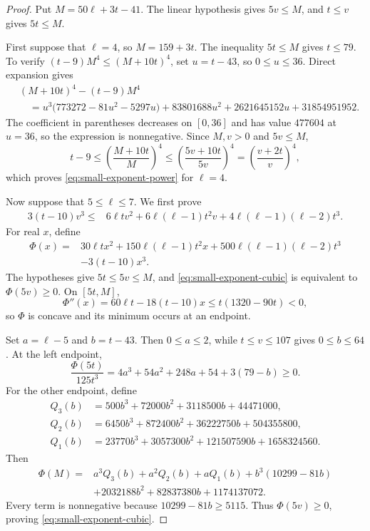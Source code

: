 \begin{proof}
Put \(M=50\ell+3t-41\).  The linear hypothesis gives \(5v\le M\), and
\(t\le v\) gives \(5t\le M\).

First suppose that \(\ell=4\), so \(M=159+3t\).  The inequality
\(5t\le M\) gives \(t\le79\).  To verify
\((t-9)M^4\le(M+10t)^4\), set \(u=t-43\), so \(0\le u\le36\).  Direct
expansion gives
\begin{align*}
 &(M+10t)^4-(t-9)M^4\\
 &\quad={}
 u^3\bigl(773272-81u^2-5297u\bigr)
 +83801688u^2+2621645152u+31854951952.
\end{align*}
The coefficient in parentheses decreases on \([0,36]\) and has value
\(477604\) at \(u=36\), so the expression is nonnegative.  Since
\(M,v>0\) and \(5v\le M\),
\[
 t-9\le\left(\frac{M+10t}{M}\right)^4
 \le\left(\frac{5v+10t}{5v}\right)^4
 =\left(\frac{v+2t}{v}\right)^4,
\]
which proves \eqref{eq:small-exponent-power} for \(\ell=4\).

Now suppose that \(5\le\ell\le7\).  We first prove
\begin{align}
 3(t-10)v^3\le{}&6\ell t v^2
 +6\ell(\ell-1)t^2v
 +4\ell(\ell-1)(\ell-2)t^3. \label{eq:small-exponent-cubic}
\end{align}
For real \(x\), define
\begin{align*}
 \Phi(x)={}&30\ell t x^2+150\ell(\ell-1)t^2x
       +500\ell(\ell-1)(\ell-2)t^3\\
       &-3(t-10)x^3.
\end{align*}
The hypotheses give \(5t\le5v\le M\), and
\eqref{eq:small-exponent-cubic} is equivalent to \(\Phi(5v)\ge0\).  On
\([5t,M]\),
\[
 \Phi''(x)=60\ell t-18(t-10)x
 \le t(1320-90t)<0,
\]
so \(\Phi\) is concave and its minimum occurs at an endpoint.

Set \(a=\ell-5\) and \(b=t-43\).  Then \(0\le a\le2\), while
\(t\le v\le107\) gives \(0\le b\le64\).  At the left endpoint,
\[
 \frac{\Phi(5t)}{125t^3}
 =4a^3+54a^2+248a+54+3(79-b)\ge0.
\]
For the other endpoint, define
\begin{align*}
 Q_3(b)&=500b^3+72000b^2+3118500b+44471000,\\
 Q_2(b)&=6450b^3+872400b^2+36222750b+504355800,\\
 Q_1(b)&=23770b^3+3057300b^2+121507590b+1658324560.
\end{align*}
Then
\begin{align*}
 \Phi(M)={}&a^3Q_3(b)+a^2Q_2(b)+aQ_1(b)
 +b^3(10299-81b)\\
 &+2032188b^2+82837380b+1174137072.
\end{align*}
Every term is nonnegative because \(10299-81b\ge5115\).  Thus
\(\Phi(5v)\ge0\), proving \eqref{eq:small-exponent-cubic}.


\end{proof}

